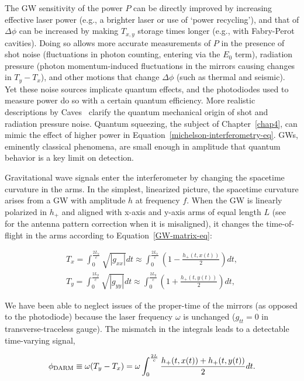 The GW sensitivity of the power $P$ can be directly improved by increasing effective laser power (e.g., a brighter laser or use of `power recycling'), and that of $\Delta \phi$ can be increased by making $T_{x,y}$ storage times longer (e.g., with Fabry-Perot cavities).
Doing so allows more accurate measurements of $P$ in the presence of shot noise (fluctuations in photon counting, entering via the $E_0$ term), radiation pressure (photon momentum-induced fluctuations in the mirrors causing changes in $T_y - T_x$), and other motions that change $\Delta \phi$ (such as thermal and seismic).
Yet these noise sources implicate quantum effects, and the photodiodes used to measure power do so with a certain quantum efficiency.
More realistic descriptions by Caves~\cite{Caves1980,Caves1981} clarify the quantum mechanical origin of shot and radiation pressure noise.
Quantum squeezing, the subject of Chapter~\ref{chap4}, can mimic the effect of higher power in Equation~\ref{michelson-interferometry-eq}.
GWs, eminently classical phenomena, are small enough in amplitude that quantum behavior is a key limit on detection.

Gravitational wave signals enter the interferometer by changing the spacetime curvature in the arms. 
In the simplest, linearized picture, the spacetime curvature arises from a GW with amplitude $h$ at frequency $f$.
When the GW is linearly polarized in $h_+$ and aligned with x-axis and y-axis arms of equal length $L$ (see~\cite{Jaranowski1998} for the antenna pattern correction when it is misaligned), it changes the time-of-flight in the arms according to Equation~\ref{GW-matrix-eq}:

\begin{eqnarray}
T_x = \int_0^{\frac{2L_x}{c}} \sqrt{|g_{xx}|} dt \approx \int_0^{\frac{2L_x}{c}} \left(1 - \frac{h_+ (t,x(t))}{2} \right) dt, \\
T_y = \int_0^{\frac{2L_y}{c}} \sqrt{|g_{yy}|} dt \approx \int_0^{\frac{2L_y}{c}} \left(1 + \frac{h_+ (t, y(t))}{2} \right) dt,
\end{eqnarray}

\noindent We have been able to neglect issues of the proper-time of the mirrors (as opposed to the photodiode) because the laser frequency $\omega$ is unchanged ($g_{tt} = 0$ in transverse-traceless gauge).
The mismatch in the integrals leads to a detectable time-varying signal,

\begin{equation}
\phi_{\textup{DARM}} \equiv \omega (T_y - T_x) = \omega \int_0^{\frac{2L}{c}} \frac{h_+ (t, x(t)) + h_+ (t, y(t))}{2} dt.
\end{equation}  

